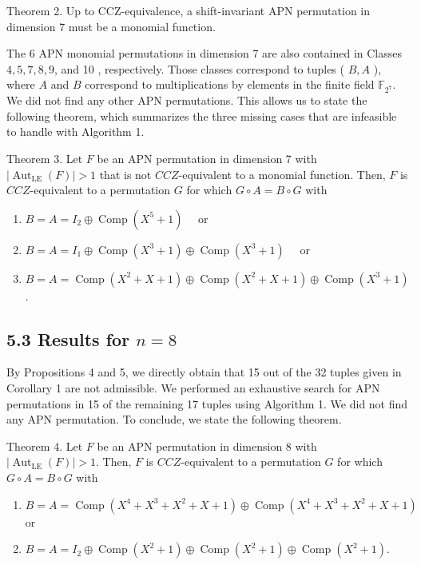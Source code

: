 \documentclass[10pt]{article}
\begin{document}
Theorem 2. Up to CCZ-equivalence, a shift-invariant APN permutation in dimension 7 must be a monomial function.

The 6 APN monomial permutations in dimension 7 are also contained in Classes $4,5,7,8,9$, and 10 , respectively. Those classes correspond to tuples ( $B, A$ ), where $A$ and $B$ correspond to multiplications by elements in the finite field $\mathbb{F}_{2^{7}}$. We did not find any other APN permutations. This allows us to state the following theorem, which summarizes the three missing cases that are infeasible to handle with Algorithm 1.

Theorem 3. Let $F$ be an APN permutation in dimension 7 with $\left|\operatorname{Aut}_{\mathrm{LE}}(F)\right|>1$ that is not $C C Z$-equivalent to a monomial function. Then, $F$ is $C C Z$-equivalent to a permutation $G$ for which $G \circ A=B \circ G$ with

\begin{enumerate}
  \item $B=A=I_{2} \oplus \operatorname{Comp}\left(X^{5}+1\right) \quad$ or
  \item $B=A=I_{1} \oplus \operatorname{Comp}\left(X^{3}+1\right) \oplus \operatorname{Comp}\left(X^{3}+1\right) \quad$ or
  \item $B=A=\operatorname{Comp}\left(X^{2}+X+1\right) \oplus \operatorname{Comp}\left(X^{2}+X+1\right) \oplus \operatorname{Comp}\left(X^{3}+1\right)$.
\end{enumerate}

\subsection*{5.3 Results for $n=8$}
By Propositions 4 and 5, we directly obtain that 15 out of the 32 tuples given in Corollary 1 are not admissible. We performed an exhaustive search for APN permutations in 15 of the remaining 17 tuples using Algorithm 1. We did not find any APN permutation. To conclude, we state the following theorem.

Theorem 4. Let $F$ be an APN permutation in dimension 8 with $\left|\operatorname{Aut}_{\mathrm{LE}}(F)\right|>1$. Then, $F$ is $C C Z$-equivalent to a permutation $G$ for which $G \circ A=B \circ G$ with

\begin{enumerate}
  \item $B=A=\operatorname{Comp}\left(X^{4}+X^{3}+X^{2}+X+1\right) \oplus \operatorname{Comp}\left(X^{4}+X^{3}+X^{2}+X+1\right) \quad$ or
  \item $B=A=I_{2} \oplus \operatorname{Comp}\left(X^{2}+1\right) \oplus \operatorname{Comp}\left(X^{2}+1\right) \oplus \operatorname{Comp}\left(X^{2}+1\right)$.
\end{enumerate}
\end{document}
